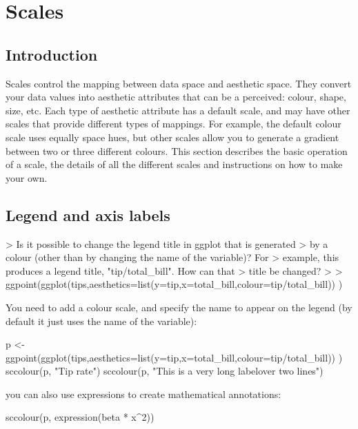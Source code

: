 


\chapter{Scales}

\section{Introduction}\label{sec:introduction}

Scales control the mapping between data space and aesthetic space.  They convert your data values into aesthetic attributes that can be a perceived: colour, shape, size, etc.  Each type of aesthetic attribute has a default scale, and may have other scales that provide different types of mappings.  For example, the default colour scale uses equally space hues, but other scales allow you to generate a gradient between two or three different colours.  This section describes the basic operation of a scale, the details of all the different scales and instructions on how to make your own.

\section{Legend and axis labels}\label{sec:legend_and_axis_labels} %

> Is it possible to change the legend title in ggplot that is generated
> by a colour (other than by changing the name of the variable)?  For
> example, this produces a legend title, "tip/total_bill".  How can that
> title be changed?
> 
> ggpoint(ggplot(tips,aesthetics=list(y=tip,x=total_bill,colour=tip/total_bill)) )

You need to add a colour scale, and specify the name to appear on the legend (by default it just uses the name of the variable):

p <- ggpoint(ggplot(tips,aesthetics=list(y=tip,x=total_bill,colour=tip/total_bill)) )
sccolour(p, "Tip rate")
sccolour(p, "This is a very long label\nsplit over two lines")

you can also use expressions to create mathematical annotations:

sccolour(p, expression(beta * x^2))



